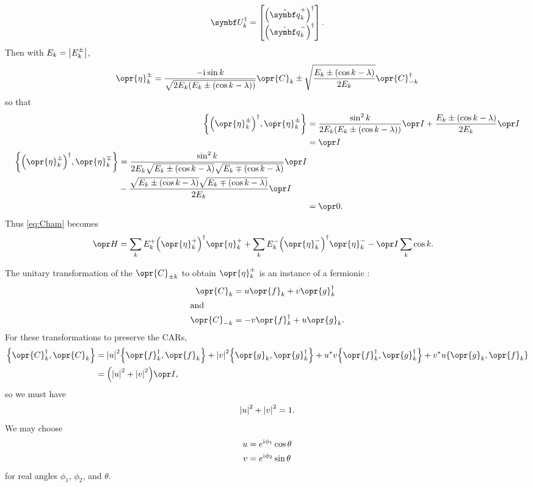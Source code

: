 \documentclass[../thesis.tex]{subfiles}
\begin{document}
\begin{equation}
  \mq{U}_k^\dag
  = \bmqty{%
    {\qty(\hat{\vq{q}}_k^+)}^\dag \\
    {\qty(\hat{\vq{q}}_k^-)}^\dag
  }.
\end{equation}
Then with $E_k = \abs{E_k^\pm}$,
\begin{equation}
  \opr{\eta}_k^\pm
  = \frac{-\im\sin k}{\sqrt{2E_k\qty(E_k \pm (\cos k - \lambda))}}
  \opr{C}_k
  \pm \sqrt{\frac{E_k \pm (\cos k - \lambda)}{2E_k}}
  \opr{C}^\dag_{-k}
\end{equation}
so that
\begin{align}
  \acomm{{\qty(\opr{\eta}_k^\pm)}^\dag}{\opr{\eta}_k^\pm}
  &= \frac{\sin^2 k}{2E_k\qty(E_k \pm (\cos k - \lambda))} \idopr
  + \frac{E_k \pm (\cos k - \lambda)}{2E_k} \idopr \\
  &= \idopr
  \\
  \begin{split}
  \acomm{{\qty(\opr{\eta}_k^\pm)}^\dag}{\opr{\eta}_k^\mp}
  &= \frac{\sin^2 k}{2E_k
    \sqrt{E_k \pm (\cos k - \lambda)}
  \sqrt{E_k \mp (\cos k - \lambda)}} \idopr \\
  &- \frac{\sqrt{E_k \pm (\cos k - \lambda)}\sqrt{E_k \mp (\cos k - \lambda)}}{%
  2 E_k} \idopr
  \end{split}
  \\
  &= \zopr.
\end{align}
Thus \cref{eq:Cham} becomes
\begin{align}
  \ham
  &= \sum_k E_k^+{\qty(\opr{\eta}_k^+)}^\dag\opr{\eta}_k^+
  + \sum_k E_k^-{\qty(\opr{\eta}_k^-)}^\dag\opr{\eta}_k^-
  - \idopr\sum_k \cos k.
\end{align}

The unitary transformation of the $\opr{C}_{\pm k}$ to obtain $\opr{\eta}_k^\pm$
is an instance of a fermionic :
\begin{subequations}
  \begin{align}
    \opr{C}_k
  &= u\opr{f}_k + v\opr{g}_k^\dag \\
  \shortintertext{and}
  \opr{C}_{-k}
  &= -v\opr{f}_k^\dag + u\opr{g}_k.
  \end{align}\label{eq:bogoliubov}
\end{subequations}
For these transformations to preserve the CARs,
\begin{align}
  \acomm{\opr{C}_k^\dag}{\opr{C}_k}
  &= \abs{u}^2 \acomm{\opr{f}_k^\dag}{\opr{f}_k}
  + \abs{v}^2 \acomm{\opr{g}_k}{\opr{g}_k^\dag}
  + u^* v \acomm{\opr{f}_k^\dag}{\opr{g}_k^\dag}
  + v^* u \acomm{\opr{g}_k}{\opr{f}_k} \\
  &= \qty(\abs{u}^2 + \abs{v}^2) \idopr,
\end{align}
so we must have
\begin{equation}
  \abs{u}^2 + \abs{v}^2 = 1.
\end{equation}
We may choose
\begin{subequations}
  \begin{align}
    u &= e^{\mathrm{i}\mkern1mu\phi_1}\cos\theta \\
    v &= e^{\mathrm{i}\mkern1mu\phi_2}\sin\theta
  \end{align}\label{eq:uv-param}
\end{subequations}
for real angles $\phi_1$, $\phi_2$, and $\theta$.
\end{document}
